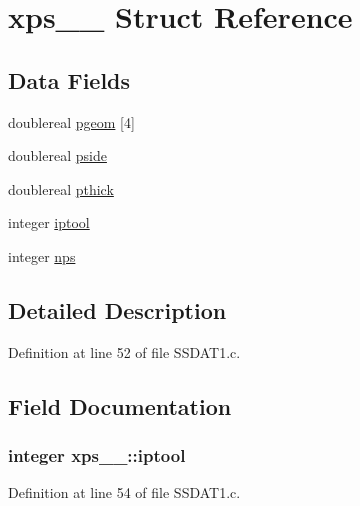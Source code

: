 \hypertarget{structxps__1__}{}\section{xps\+\_\+\_\+ Struct Reference}
\label{structxps__1__}
\subsection*{Data Fields}
\begin{DoxyCompactItemize}
\item 
doublereal \hyperlink{structxps__1___a0080855d73d61551eaf14cce3ffa64ed}{pgeom} \mbox{[}4\mbox{]}
\item 
doublereal \hyperlink{structxps__1___a60dd9c649d3821fc90a07d7620f044f9}{pside}
\item 
doublereal \hyperlink{structxps__1___a60e15bd24df26974e2995e4963e28b47}{pthick}
\item 
integer \hyperlink{structxps__1___a583e97967a0ee2d9510f34e32c07feb3}{iptool}
\item 
integer \hyperlink{structxps__1___a4be73b17200df038f2e05a151ed9f73c}{nps}
\end{DoxyCompactItemize}


\subsection{Detailed Description}


Definition at line 52 of file S\+S\+D\+A\+T1.\+c.



\subsection{Field Documentation}
\subsubsection[{\texorpdfstring{iptool}{iptool}}]{\setlength{\rightskip}{0pt plus 5cm}integer xps\+\_\+\_\+\+::iptool}\hypertarget{structxps__1___a583e97967a0ee2d9510f34e32c07feb3}{}\label{structxps__1___a583e97967a0ee2d9510f34e32c07feb3}


Definition at line 54 of file S\+S\+D\+A\+T1.\+c.

